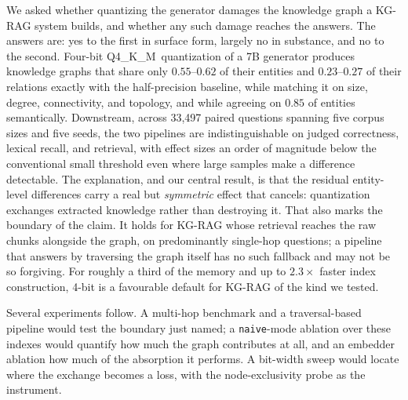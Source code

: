 \documentclass[conference, table]{IEEEtran}
\newcommand{\qfour}{Q4\_K\_M}
\begin{document}
\noindent
We asked whether quantizing the generator damages the knowledge graph a KG-RAG system builds, and whether any such damage reaches the answers. The answers are: yes to the first in surface form, largely no in substance, and no to the second. Four-bit \qfour\ quantization of a 7B generator produces knowledge graphs that share only $0.55$--$0.62$ of their entities and $0.23$--$0.27$ of their relations exactly with the half-precision baseline, while matching it on size, degree, connectivity, and topology, and while agreeing on $0.85$ of entities semantically. Downstream, across 33{,}497 paired questions spanning five corpus sizes and five seeds, the two pipelines are indistinguishable on judged correctness, lexical recall, and retrieval, with effect sizes an order of magnitude below the conventional small threshold even where large samples make a difference detectable. The explanation, and our central result, is that the residual entity-level differences carry a real but \emph{symmetric} effect that cancels: quantization exchanges extracted knowledge rather than destroying it. That also marks the boundary of the claim. It holds for KG-RAG whose retrieval reaches the raw chunks alongside the graph, on predominantly single-hop questions; a pipeline that answers by traversing the graph itself has no such fallback and may not be so forgiving. For roughly a third of the memory and up to $2.3\times$ faster index construction, 4-bit is a favourable default for KG-RAG of the kind we tested.

\noindent
Several experiments follow. A multi-hop benchmark and a traversal-based pipeline would test the boundary just named; a \texttt{naive}-mode ablation over these indexes would quantify how much the graph contributes at all, and an embedder ablation how much of the absorption it performs. A bit-width sweep would locate where the exchange becomes a loss, with the node-exclusivity probe as the instrument.



\end{document}
